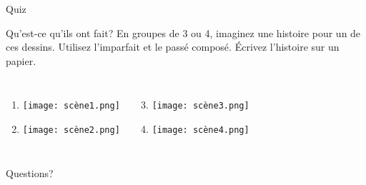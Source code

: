 \documentclass{beamer}
\begin{document}
  \begin{frame}{}
    \begin{center}
      \Large Quiz
    \end{center}
  \end{frame}

  \begin{frame}{Qu'est-ce qu'ils ont fait?}
    \small
    En groupes de 3 ou 4, imaginez une histoire pour un de ces dessins.
    Utilisez l'imparfait et le passé composé.
    Écrivez l'histoire sur un papier.
    \begin{columns}[t]
        \begin{enumerate}
          \item \texttt{[image: scène1.png]}
          \item \texttt{[image: scène2.png]}
        \end{enumerate}
        \begin{enumerate}
          \setcounter{enumi}{2}
          \item \texttt{[image: scène3.png]}
          \item \texttt{[image: scène4.png]}
        \end{enumerate}
    \end{columns}
  \end{frame}

  \begin{frame}{}
    \begin{center}
      \Large Questions?
    \end{center}
  \end{frame}
\end{document}
